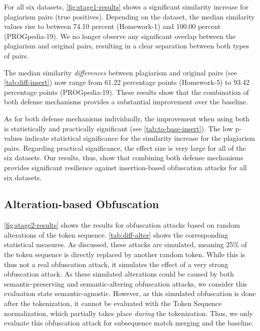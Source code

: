 For all six datasets, \autoref{fig:stage1-results} shows a significant similarity increase for plagiarism pairs (true positives).
Depending on the dataset, the median similarity values rise to between 74.10 percent (Homework-1) and 100.00 percent (PROGpedia-19).
We no longer observe any significant overlap between the plagiarism and original pairs, resulting in a clear separation between both types of pairs.

The median similarity \textit{differences} between plagiarism and original pairs (see \autoref{tab:diff-insert}) now range from 61.22 percentage points (Homework-5) to 93.42  percentage points (PROGpedia-19).
These results show that the combination of both defense mechanisms provides a substantial improvement over the baseline. 

As for both defense mechanisms individually, the improvement when using both is statistically and practically significant (see \autoref{tab:to-base-insert}).
The low p-values indicate statistical significance for the similarity increase for the plagiarism pairs.
Regarding practical significance, the effect size is very large for all of the six datasets.
Our results, thus, show that combining both defense mechanisms provides significant resilience against insertion-based obfuscation attacks for all six datasets.


\subsection{Alteration-based Obfuscation}\label{sec:eval-alter}
\autoref{fig:stage2-results} shows the results for obfuscation attacks based on random alterations of the token sequence.
\autoref{tab:diff-alter} shows the corresponding statistical measures.
As discussed, these attacks are simulated, meaning 25\% of the token sequence is directly replaced by another random token. While this is thus not a real obfuscation attack, it simulates the effect of a very strong obfuscation attack. As these simulated alterations could be caused by both semantic-preserving and semantic-altering obfuscation attacks, we consider this evaluation state semantic-agnostic. However, as this simulated obfuscation is done after the tokenization, it cannot be evaluated with the Token Sequence normalization, which partially takes place \textit{during} the tokenization.
Thus, we only evaluate this obfuscation attack for subsequence match merging and the baseline.

